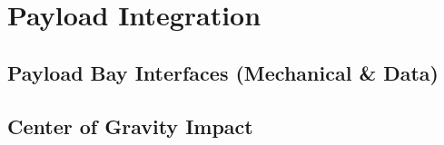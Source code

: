 ﻿\chapter{Payload Integration}
\label{ch:payload}
\section{Payload Bay Interfaces (Mechanical \& Data)}
\section{Center of Gravity Impact}
